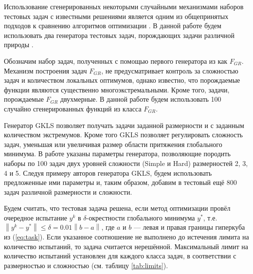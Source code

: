 \documentclass{svproc}
\begin{document}
\begin{Russian}

Использование сгенерированных некоторыми случайными механизмами
наборов тестовых задач с известными решениями является одним из общепринятых подходов
к сравнению алгоритмов оптимизации \cite{Beiranvand2017}. В данной работе
будем использовать два генератора тестовых задач, порождающих задачи различной природы \cite{grishaginClass, Gaviano2003}.

Обозначим набор задач, полученных с помощью первого генератора из \cite{grishaginClass} как \(F_{GR}\). Механизм построения задач \(F_{GR}\),
не предусматривает контроль за сложностью задач и количеством локальных оптимумов, однако известно, что порождаемые функции
являются существенно многоэкстремальными. Кроме того, задачи, порождаемые \(F_{GR}\) двухмерные. В данной работе будем использовать
100 случайно сгенерированных функций из класса \(F_{GR}\).

Генератор GKLS \cite{Gaviano2003} позволяет получать задачи заданной размерности и с заданным количеством экстремумов.
Кроме того GKLS позволяет регулировать сложность задач, уменьшая или увеличивая размер области притяжения глобального минимума.
В работе \cite{SergeyevKvasov2006} указаны параметры генератора, позволяющие породить наборы по 100 задач двух уровней сложности
(Simple и Hard) размерностей 2, 3, 4 и 5. Следуя примеру авторов генератора GKLS, будем использовать предложенные ими параметры и,
таким образом, добавим в тестовый ещё 800 задач различной размерности и сложности.

Будем считать, что тестовая задача решена, если метод оптимизации провёл очередное испытание \(y^k\) в
\(\delta\)-окрестности глобального минимума \(y^*\), т.е. $\left\|y^k-
y^*\right\|\leqslant \delta = 0.01\left\|b-a\right\|$, где \(a\) и \(b\) --- левая и правая границы гиперкуба из (\ref{eq:task}).
Если указанное соотношение не выполнено до истечения лимита на количество испытаний, то задача считается нерешённой.
Максимальный лимит на количество испытаний установлен для каждого класса задач, в соответствии с размерностью и сложностью (см. таблицу \ref{tab:limits}).


\end{Russian}
\end{document}
